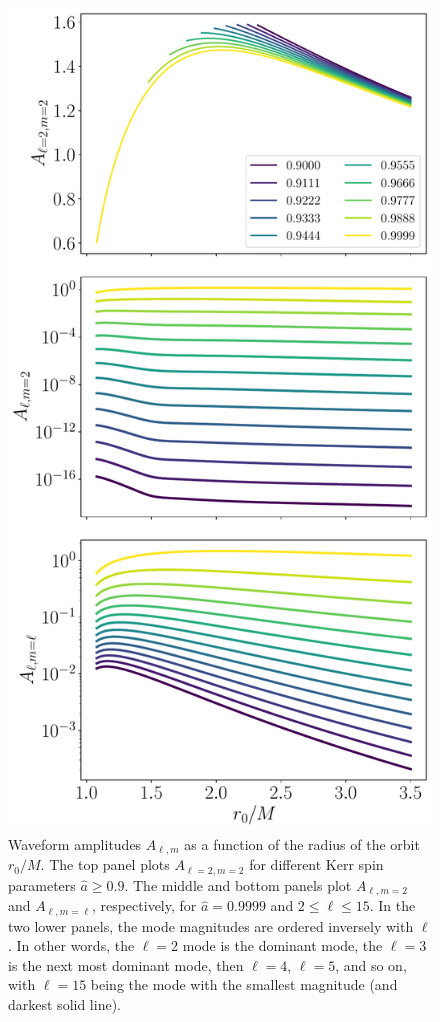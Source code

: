 \documentclass[%
 reprint,
 nofootinbib,
 amsmath,amssymb,
 aps,
 prd,
]{revtex4-2}
\begin{document}
\begin{figure}[!tp]
    \centering
    \includegraphics[width=0.95\linewidth]{figures/amp_combined.pdf}
    \caption{Waveform amplitudes $A_{\ell, m}$ as a function of the radius of the orbit $r_0/M$. The top panel plots $A_{\ell=2, m=2}$ for different Kerr spin parameters $\hat{a}\geq 0.9$. The middle and bottom panels plot $A_{\ell, m=2}$ and $A_{\ell, m=\ell}$, respectively, for $\hat{a} = 0.9999$ and $2 \leq \ell \leq 15$. In the two lower panels, the mode magnitudes are ordered inversely with $\ell$. In other words, the $\ell = 2$ mode is the dominant mode, the $\ell = 3$ is the next most dominant mode, then $\ell =4$, $\ell = 5$, and so on, with $\ell = 15$ being the mode with the smallest magnitude (and darkest solid line). }
    \label{fig:amplitudeVariation}
\end{figure}
\end{document}
